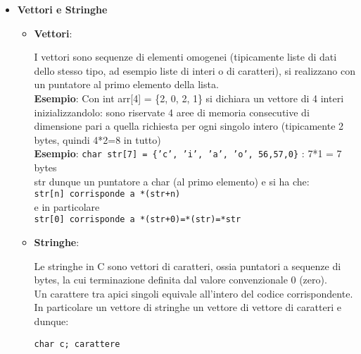 \begin{flushleft}
\begin{itemize}
          Il processo \ace terminato restituendo il valore status come codice di uscita. Si ottiene 
          lo stesso effetto se all'interno della funzione main si ha return status.
          La funzione non ha un valore di ritorno proprio perch\ace non sono eseguite ulteriori 
          istruzioni dopo di essa.\\
          Il processo chiamante \ace informato della terminazione tramite un segnale apposito. 
    \item \textbf{Vettori e Stringhe} \par 
          \begin{itemize}
            \item \textbf{Vettori}: \par I vettori sono sequenze di elementi omogenei (tipicamente liste di dati dello stesso 
            tipo, ad esempio liste di interi o di caratteri), si realizzano con un puntatore al primo elemento della lista.\\
            \textbf{Esempio}: Con int arr[4] = \{2, 0, 2, 1\} si dichiara un vettore di 4 interi 
            inizializzandolo: sono riservate 4 aree di memoria consecutive di dimensione pari a 
            quella richiesta per ogni singolo intero (tipicamente 2 bytes, quindi 4*2=8 in tutto) \\ 
            \textbf{Esempio}: \texttt{char str[7] = \{'c', 'i', 'a', 'o', 56,57,0\}} : 7*1 = 7 bytes\\
            str \ace dunque un puntatore a char (al primo elemento) e si ha che: \\
            \texttt{str[n] corrisponde a *(str+n)}\\
            e in particolare \\
            \texttt{str[0] corrisponde a *(str+0)=*(str)=*str}\\
            \item \textbf{Stringhe}:\par 
            Le stringhe in C sono vettori di caratteri, ossia puntatori a sequenze di bytes, la cui 
            terminazione \ace definita dal valore convenzionale 0 (zero).\\
            Un carattere tra apici singoli equivale all'intero del codice corrispondente. \\
            In particolare un vettore di stringhe \ace un vettore di vettore di caratteri e dunque:
           \begin{flushleft}
              \texttt{char c; carattere} \\

\end{flushleft}
\end{itemize}
\end{itemize}
\end{flushleft}

